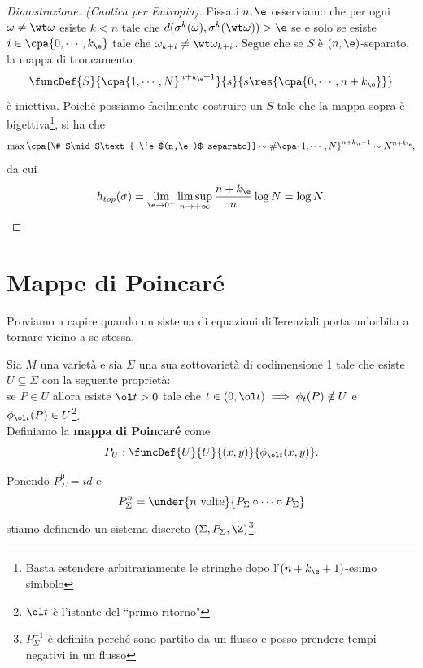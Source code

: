 \begin{proof}[Dimostrazione. (Caotica per Entropia)]
Fissati $n,\e$ osserviamo che per ogni $\omega\neq \wt\omega$ esiste $k<n$ tale che $d(\sigma^k(\omega),\sigma^k(\wt \omega))>\e$ se e solo se esiste $i\in\cpa{0,\cdots, k_\e}$ tale che $\omega_{k+i}\neq \wt \omega_{k+i}$. Segue che se $S$ \`e $(n,\e)$-separato, la mappa di troncamento
\[\funcDef{S}{\cpa{1,\cdots, N}^{n+k_\e+1}}{s}{s\res{\cpa{0,\cdots, n+k_\e}}}\] \`e iniettiva. Poich\'e possiamo facilmente costruire un $S$ tale che la mappa sopra \`e bigettiva\footnote{Basta estendere arbitrariamente le stringhe dopo l'$(n+k_\e+1)$-esimo simbolo}, si ha che
\[\max\cpa{\# S\mid S\text{ \`e $(n,\e)$-separato}}\sim \#\cpa{1,\cdots, N}^{n+k_\e+1}\sim N^{n+k_\e},\]
da cui
\[h_{top}(\sigma)=\lim_{\e\to0^+}\limsup_{n\to+\infty} \frac{n+k_\e}n\log N=\log N.\]
\end{proof}

\section{Mappe di Poincar\'e}
Proviamo a capire quando un sistema di equazioni differenziali porta un'orbita a tornare vicino a se stessa.

\begin{definition}
Sia $M$ una variet\`a e sia $\Sigma$ una sua sottovariet\`a di codimensione 1 tale che esiste $U\subseteq \Sigma$ con la seguente propriet\`a:\\
se $P\in U$ allora esiste $\ol t>0$ tale che $t\in (0,\ol t)\implies \phi_t(P)\notin U$ e $\phi_{\ol t}(P)\in U$\footnote{$\ol t$ \`e l'istante del ``primo ritorno"}.\\
Definiamo la \textbf{mappa di Poincar\'e} come
\[P_U:\funcDef{U}{U}{(x,y)}{\phi_{\ol t}(x,y)}.\]
\end{definition}
\begin{remark}
Ponendo $P_\Sigma^0=id$ e
\[P_\Sigma^n=\under{n\text{ volte}}{P_\Sigma\circ\cdots\circ P_\Sigma}\]
stiamo definendo un sistema discreto $(\Sigma,P_\Sigma,\Z)$\footnote{$P_\Sigma^{-1}$ \`e definita perch\'e sono partito da un flusso e posso prendere tempi negativi in un flusso}.
\end{remark}

